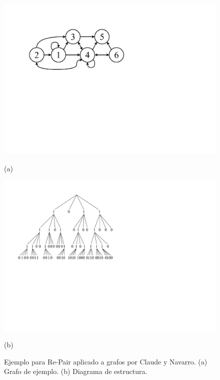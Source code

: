 \begin{figure}%
    	\centering
    	\begin{minipage}{1\textwidth}
    		\centering
    		\includegraphics[scale=.6, clip,  trim=270 280 250 0]{img/arte/graphs-repair.pdf}
    		
    		(a)
    	\end{minipage}
    	\begin{minipage}{0.45\textwidth}
    		\centering
    		\includegraphics[scale=.5, clip, trim=50 280 410 0]{img/arte/graphs-k2tree.pdf}
    		
    		(b)
    	\end{minipage}

    \caption{Ejemplo para Re-Pair aplicado a grafos por Claude y Navarro. (a) Grafo de ejemplo. (b) Diagrama de estructura.}
    \label{fig:repairCN}
\end{figure}
